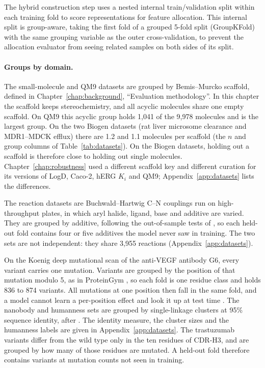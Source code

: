 The hybrid construction step uses a nested internal train/validation split within each training fold to score representations for feature allocation. This internal split is group-aware, taking the first fold of a grouped 5-fold split (GroupKFold) with the same grouping variable as the outer cross-validation, to prevent the allocation evaluator from seeing related samples on both sides of its split.

\paragraph{Groups by domain.} The small-molecule and QM9 datasets are grouped by Bemis--Murcko scaffold, defined in Chapter~\ref{chap:background}, ``Evaluation methodology''. In this chapter the scaffold keeps stereochemistry, and all acyclic molecules share one empty scaffold. On QM9 this acyclic group holds 1,041 of the 9,978 molecules and is the largest group. On the two Biogen datasets (rat liver microsome clearance and MDR1--MDCK efflux) there are 1.2 and 1.1 molecules per scaffold (the $n$ and group columns of Table~\ref{tab:datasets}). On the Biogen datasets, holding out a scaffold is therefore close to holding out single molecules. Chapter~\ref{chap:robustness} used a different scaffold key and different curation for its versions of LogD, Caco-2, hERG $K_i$ and QM9; Appendix~\ref{app:datasets} lists the differences.

The reaction datasets are Buchwald--Hartwig C--N couplings run on high-throughput plates, in which aryl halide, ligand, base and additive are varied. They are grouped by additive, following the out-of-sample tests of \citet{Ahneman2018}, so each held-out fold contains four or five additives the model never saw in training. The two sets are not independent: they share 3,955 reactions (Appendix~\ref{app:datasets}).

On the Koenig deep mutational scan of the anti-VEGF antibody G6, every variant carries one mutation. Variants are grouped by the position of that mutation modulo 5, as in ProteinGym \citep{Notin2023}, so each fold is one residue class and holds 836 to 874 variants. All mutations at one position then fall in the same fold, and a model cannot learn a per-position effect and look it up at test time \citep{Vieira2026}. The nanobody and humanness sets are grouped by single-linkage clusters at 95\% sequence identity, after \citet{Kenlay2024}. The identity measure, the cluster sizes and the humanness labels are given in Appendix~\ref{app:datasets}. The trastuzumab variants differ from the wild type only in the ten residues of CDR-H3, and are grouped by how many of those residues are mutated. A held-out fold therefore contains variants at mutation counts not seen in training.

